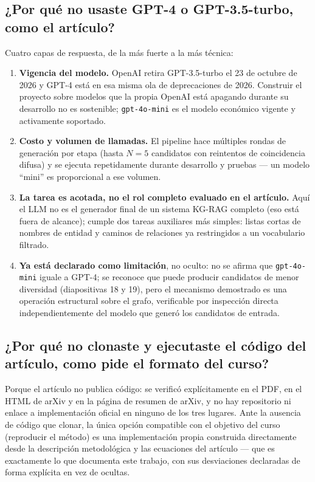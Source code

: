 \documentclass[11pt]{article}
\begin{document}
\subsection*{¿Por qué no usaste GPT-4 o GPT-3.5-turbo, como el artículo?}
Cuatro capas de respuesta, de la más fuerte a la más técnica:
\begin{enumerate}
  \item \textbf{Vigencia del modelo.} OpenAI retira GPT-3.5-turbo el 23 de octubre de 2026 y
    GPT-4 está en esa misma ola de deprecaciones de 2026. Construir el proyecto sobre
    modelos que la propia OpenAI está apagando durante su desarrollo no es sostenible;
    \texttt{gpt-4o-mini} es el modelo económico vigente y activamente soportado.
  \item \textbf{Costo y volumen de llamadas.} El pipeline hace múltiples rondas de
    generación por etapa (hasta $N=5$ candidatos con reintentos de coincidencia difusa) y se
    ejecuta repetidamente durante desarrollo y pruebas --- un modelo ``mini'' es
    proporcional a ese volumen.
  \item \textbf{La tarea es acotada, no el rol completo evaluado en el artículo.} Aquí el
    LLM no es el generador final de un sistema KG-RAG completo (eso está fuera de alcance);
    cumple dos tareas auxiliares más simples: listas cortas de nombres de entidad y caminos
    de relaciones ya restringidos a un vocabulario filtrado.
  \item \textbf{Ya está declarado como limitación}, no oculto: no se afirma que
    \texttt{gpt-4o-mini} iguale a GPT-4; se reconoce que puede producir candidatos de menor
    diversidad (diapositivas 18 y 19), pero el mecanismo demostrado es una operación
    estructural sobre el grafo, verificable por inspección directa independientemente del
    modelo que generó los candidatos de entrada.
\end{enumerate}

\subsection*{¿Por qué no clonaste y ejecutaste el código del artículo, como pide el formato
del curso?}
Porque el artículo no publica código: se verificó explícitamente en el PDF, en el HTML de
arXiv y en la página de resumen de arXiv, y no hay repositorio ni enlace a implementación
oficial en ninguno de los tres lugares. Ante la ausencia de código que clonar, la única
opción compatible con el objetivo del curso (reproducir el método) es una implementación
propia construida directamente desde la descripción metodológica y las ecuaciones del
artículo --- que es exactamente lo que documenta este trabajo, con sus desviaciones
declaradas de forma explícita en vez de ocultas.
\end{document}
